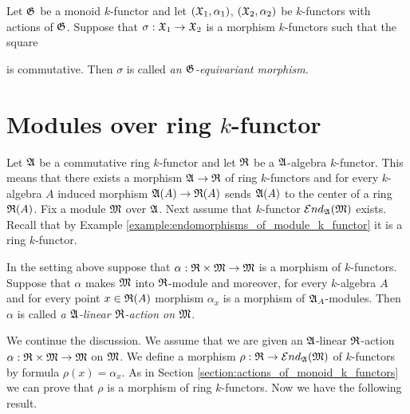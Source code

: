 \begin{definition}
Let ${\mathfrak G}$ be a monoid $k$-functor and let $({\mathfrak X}_1,\alpha_1)$, $({\mathfrak X}_2,\alpha_2)$ be $k$-functors with actions of ${\mathfrak G}$. Suppose that $\sigma:{\mathfrak X}_1\rightarrow {\mathfrak X}_2$ is a morphism $k$-functors such that the square
\begin{center}
\end{center}
is commutative. Then $\sigma$ is called \textit{an ${\mathfrak G}$-equivariant morphism}.
\end{definition}

\section{Modules over ring $k$-functor}
\noindent
Let ${\mathfrak A}$ be a commutative ring $k$-functor and let ${\mathfrak R}$ be a ${\mathfrak A}$-algebra $k$-functor. This means that there exists a morphism ${\mathfrak A}\rightarrow {\mathfrak R}$ of ring $k$-functors and for every $k$-algebra $A$ induced morphism ${\mathfrak A}(A)\rightarrow {\mathfrak R}(A)$ sends ${\mathfrak A}(A)$ to the center of a ring ${\mathfrak R}(A)$. Fix a module ${\mathfrak M}$ over ${\mathfrak A}$. Next assume that $k$-functor ${\mathcal E} nd_{{\mathfrak A}}({\mathfrak M})$ exists. Recall that by Example \ref{example:endomorphisms_of_module_k_functor} it is a ring $k$-functor.

\begin{definition}
In the setting above suppose that $\alpha:{\mathfrak R}\times {\mathfrak M}\rightarrow {\mathfrak M}$ is a morphism of $k$-functors. Suppose that $\alpha$ makes ${\mathfrak M}$ into ${\mathfrak R}$-module and moreover, for every $k$-algebra $A$ and for every point $x\in {\mathfrak R}(A)$ morphism $\alpha_x$ is a morphism of ${\mathfrak A}_A$-modules. Then $\alpha$ is called \textit{a ${\mathfrak A}$-linear ${\mathfrak R}$-action on ${\mathfrak M}$}.
\end{definition}
\noindent
We continue the discussion. We assume that we are given an ${\mathfrak A}$-linear ${\mathfrak R}$-action $\alpha:{\mathfrak R}\times {\mathfrak M} \rightarrow {\mathfrak M}$ on ${\mathfrak M}$. We define a morphism $\rho:{\mathfrak R}\rightarrow {\mathcal E} nd_{{\mathfrak A}}({\mathfrak M})$ of $k$-functors by formula $\rho(x) = \alpha_x$. As in Section \ref{section:actions_of_monoid_k_functors} we can prove that $\rho$ is a morphism of ring $k$-functors. Now we have the following result.

